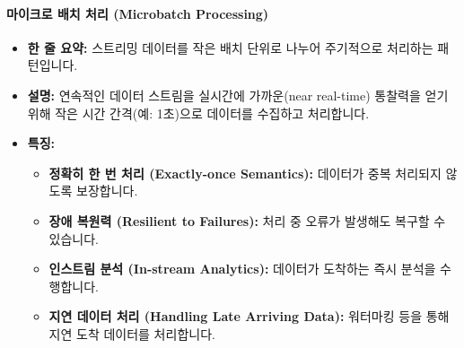 \documentclass[11pt,a4paper]{article}
\theoremstyle{definition}
\begin{document}
\paragraph{마이크로 배치 처리 (Microbatch Processing)}
\begin{itemize}
    \item \textbf{한 줄 요약:} 스트리밍 데이터를 작은 배치 단위로 나누어 주기적으로 처리하는 패턴입니다.
    \item \textbf{설명:} 연속적인 데이터 스트림을 실시간에 가까운(near real-time) 통찰력을 얻기 위해 작은 시간 간격(예: 1초)으로 데이터를 수집하고 처리합니다.
    \item \textbf{특징:}
    \begin{itemize}
        \item \textbf{정확히 한 번 처리 (Exactly-once Semantics):} 데이터가 중복 처리되지 않도록 보장합니다.
        \item \textbf{장애 복원력 (Resilient to Failures):} 처리 중 오류가 발생해도 복구할 수 있습니다.
        \item \textbf{인스트림 분석 (In-stream Analytics):} 데이터가 도착하는 즉시 분석을 수행합니다.
        \item \textbf{지연 데이터 처리 (Handling Late Arriving Data):} 워터마킹 등을 통해 지연 도착 데이터를 처리합니다.
    \end{itemize}
\end{itemize}
\end{document}
